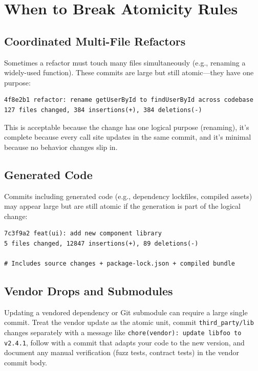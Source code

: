 \section{When to Break Atomicity Rules}

\subsection{Coordinated Multi-File Refactors}
Sometimes a refactor must touch many files simultaneously (e.g., renaming a widely-used function). These commits are large but still atomic---they have one purpose:

\begin{lstlisting}[style=shell,caption={Large but atomic refactor}]
4f8e2b1 refactor: rename getUserById to findUserById across codebase
127 files changed, 384 insertions(+), 384 deletions(-)
\end{lstlisting}

This is acceptable because the change has one logical purpose (renaming), it's complete because every call site updates in the same commit, and it's minimal because no behavior changes slip in.

\subsection{Generated Code}
Commits including generated code (e.g., dependency lockfiles, compiled assets) may appear large but are still atomic if the generation is part of the logical change:

\begin{lstlisting}[style=shell,caption={Atomic commit including generated files}]
7c3f9a2 feat(ui): add new component library
5 files changed, 12847 insertions(+), 89 deletions(-)

# Includes source changes + package-lock.json + compiled bundle
\end{lstlisting}

\subsection{Vendor Drops and Submodules}
Updating a vendored dependency or Git submodule can require a large single commit. Treat the vendor update as the atomic unit, commit \texttt{third\_party/lib} changes separately with a message like \texttt{chore(vendor): update libfoo to v2.4.1}, follow with a commit that adapts your code to the new version, and document any manual verification (fuzz tests, contract tests) in the vendor commit body.

